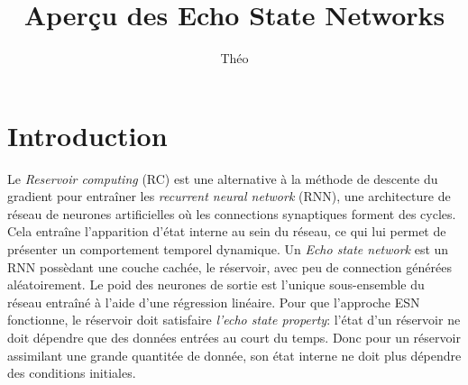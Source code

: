 \documentclass[12pt]{article}
\title{Aperçu des Echo State Networks}
\author{Théo \bsc{Biasutto--Lervat}}
\date{}
\begin{document}
\maketitle


\section{Introduction}
Le \textit{Reservoir computing} (RC) est une alternative à la méthode de descente du gradient pour entraîner les \textit{recurrent neural network} (RNN), une architecture de réseau de neurones artificielles où les connections synaptiques forment des cycles. Cela entraîne l'apparition d'état interne au sein du réseau, ce qui lui permet de présenter un comportement temporel dynamique.\newline
Un \textit{Echo state network} est un RNN possèdant une couche cachée, le réservoir, avec peu de connection générées aléatoirement. Le poid des neurones de sortie est l'unique sous-ensemble du réseau entraîné à l'aide d'une régression linéaire.\newline
Pour que l'approche ESN fonctionne, le réservoir doit satisfaire \textit{l'echo state property}: l'état d'un réservoir ne doit dépendre que des données entrées au court du temps. Donc pour un réservoir assimilant une grande quantitée de donnée, son état interne ne doit plus dépendre des conditions initiales.
\end{document}
